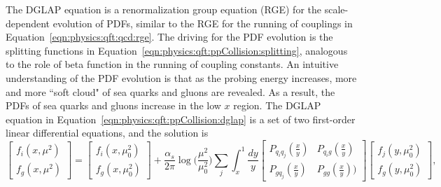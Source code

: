 \noindent The DGLAP equation is a renormalization group equation (RGE) for the scale-dependent evolution of PDFs, similar to the RGE for the running of couplings in Equation~\ref{eqn:physics:qft:qcd:rge}. The driving for the PDF evolution is the splitting functions in Equation~\ref{eqn:physics:qft:ppCollision:splitting}, analogous to the role of beta function in the running of coupling constants.  An intuitive understanding of the PDF evolution is that as the probing energy increases, more and more ``soft cloud" of sea quarks and gluons are revealed. As a result, the PDFs of sea quarks and gluons increase in the low $x$ region. The DGLAP equation in Equation~\ref{eqn:physics:qft:ppCollision:dglap} is a set of two first-order linear differential equations, and the solution is
\begin{equation}
    \begin{bmatrix} f_i(x,\mu^2) \\ f_g(x,\mu^2) \end{bmatrix} = \begin{bmatrix} f_i(x,\mu_0^2) \\ f_g(x,\mu_0^2) \end{bmatrix} + 
    \frac{\alpha_s}{2\pi} \log\bigg(\frac{\mu^2}{\mu_0^2}\bigg) 
    \sum_j \int_x^1 
    \frac{dy}{y}
    \begin{bmatrix} P_{q_i q_j}(\frac{x}{y}) & P_{q_i g}(\frac{x}{y}) \\ P_{g q_j}(\frac{x}{y}) & P_{gg}(\frac{x}{y})) \end{bmatrix} \begin{bmatrix} f_j(y,\mu^2_0) \\ f_g(y,\mu^2_0) \end{bmatrix}, 
\end{equation}

